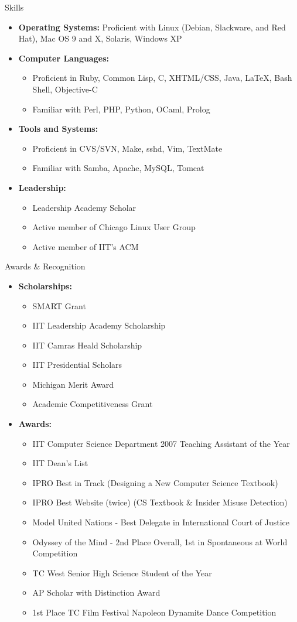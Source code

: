 \documentclass[11pt,oneside]{article}
\newenvironment{ressection}[1]{
	\vspace{4pt}
	{\fontfamily{phv}\selectfont\Large#1}
	\begin{itemize}
	\vspace{3pt}
}{
	\end{itemize}
}
\newcommand{\resitem}[1]{
	\vspace{-4pt}
	\item \begin{flushleft} #1 \end{flushleft}
}
\newcommand{\ressubitem}[1]{
	\vspace{-1pt}
	\item \begin{flushleft} #1 \end{flushleft}
}
\newenvironment{reslist}[1]{
	\resitem{\textbf{#1}}
	\vspace{-5pt}
	\begin{itemize}
}{
	\end{itemize}
}
\begin{document}
\begin{ressection}{Skills}

	\resitem{\textbf{Operating Systems:} Proficient with Linux (Debian, Slackware, and Red Hat), Mac OS 9 and X, Solaris, Windows XP}

	\begin{reslist}{Computer Languages:}

		\ressubitem{Proficient in Ruby, Common Lisp, C, XHTML/CSS, Java, \LaTeX, Bash Shell, Objective-C}

		\ressubitem{Familiar with Perl, PHP, Python, OCaml, Prolog}

	\end{reslist}

	\begin{reslist}{Tools and Systems:}

		\ressubitem{Proficient in CVS/SVN, Make, sshd, Vim, TextMate}

	\ressubitem{Familiar with Samba, Apache, MySQL, Tomcat}

	\end{reslist}
	
	\begin{reslist}{Leadership:}
		\ressubitem{Leadership Academy Scholar}
		\ressubitem{Active member of Chicago Linux User Group}
		\ressubitem{Active member of IIT's ACM}
	\end{reslist}

\end{ressection}

\begin{ressection}{Awards \& Recognition}
	\begin{reslist}{Scholarships:}
		\ressubitem{SMART Grant}
        \ressubitem{IIT Leadership Academy Scholarship}
        \ressubitem{IIT Camras Heald Scholarship}
        \ressubitem{IIT Presidential Scholars}
        \ressubitem{Michigan Merit Award}
        \ressubitem{Academic Competitiveness Grant}
	\end{reslist}
	
	\begin{reslist}{Awards:}
		\ressubitem{IIT Computer Science Department 2007 Teaching Assistant of the Year}
        \ressubitem{IIT Dean's List}
        \ressubitem{IPRO Best in Track (Designing a New Computer Science Textbook)}
        \ressubitem{IPRO Best Website (twice) (CS Textbook \& Insider Misuse Detection)}
        \ressubitem{Model United Nations - Best Delegate in International Court of Justice}
        \ressubitem{Odyssey of the Mind - 2nd Place Overall, 1st in Spontaneous at World Competition}
        \ressubitem{TC West Senior High Science Student of the Year}
		\ressubitem{AP Scholar with Distinction Award}
        \ressubitem{1st Place TC Film Festival Napoleon Dynamite Dance Competition}
	\end{reslist}
\end{ressection}
\end{document}
